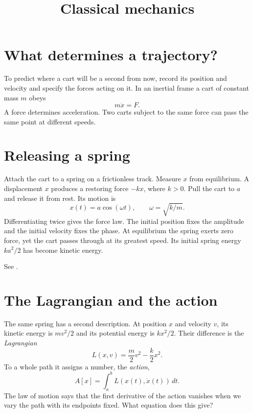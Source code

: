 



\title{
Classical mechanics}
\maketitle

\tableofcontents

\section{What determines a trajectory?}
To predict where a cart will be a second from
now, record its position and velocity and
specify the forces acting on it. In an
inertial frame a cart of constant mass $m$
obeys
$$
m\ddot x=F.
$$
A force determines acceleration. Two carts
subject to the same force can pass the same
point at different speeds.

\section{Releasing a spring}
Attach the cart to a spring on a frictionless
track. Measure $x$ from equilibrium. A
displacement $x$ produces a restoring force
$-kx$, where $k>0$. Pull the cart to $a$ and
release it from rest. Its motion is
$$
x(t)=a\cos(\omega t),\qquad
\omega=\sqrt{k/m}.
$$
Differentiating twice gives the force law.
The initial position fixes the amplitude and
the initial velocity fixes the phase. At
equilibrium the spring exerts zero force, yet
the cart passes through at its greatest
speed. Its initial spring energy $ka^2/2$ has
become kinetic energy.

See \cite[Vol. I, Sections 21-2 and
21-4]{feynman-lectures}.

\section{The Lagrangian and the action}
\label{section-action}

The same spring has a second description.
At position $x$ and velocity $v$, its
kinetic energy is $mv^2/2$ and its
potential energy is $kx^2/2$. Their
difference is the \emph{Lagrangian}
$$
L(x,v)=\frac{m}{2}v^2-\frac{k}{2}x^2.
$$
To a whole path it assigns a number, the
\emph{action},
$$
A[x]=\int_a^b L(x(t),\dot x(t))\,dt.
$$
The law of motion says that the first
derivative of the action vanishes when
we vary the path with its endpoints fixed.
What equation does this give?

